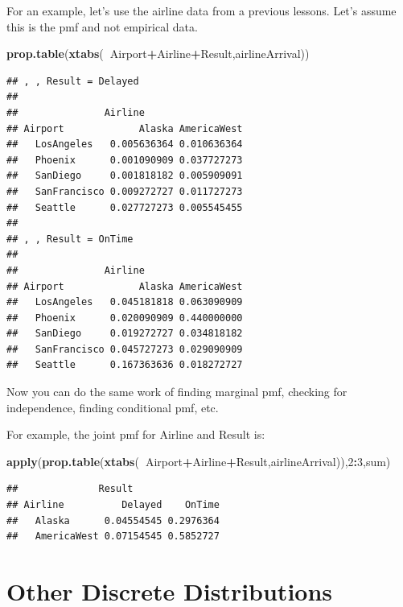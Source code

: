 \documentclass[]{book}
\newenvironment{Shaded}{\begin{snugshade}}{\end{snugshade}}
\newcommand{\KeywordTok}[1]{\textcolor[rgb]{0.13,0.29,0.53}{\textbf{#1}}}
\newcommand{\DecValTok}[1]{\textcolor[rgb]{0.00,0.00,0.81}{#1}}
\newcommand{\OperatorTok}[1]{\textcolor[rgb]{0.81,0.36,0.00}{\textbf{#1}}}
\newcommand{\NormalTok}[1]{#1}
\theoremstyle{definition}
\theoremstyle{definition}
\theoremstyle{definition}
\theoremstyle{remark}
\begin{document}
For an example, let's use the airline data from a previous lessons.
Let's assume this is the pmf and not empirical data.

\begin{Shaded}
\begin{Highlighting}[]
\KeywordTok{prop.table}\NormalTok{(}\KeywordTok{xtabs}\NormalTok{(}\OperatorTok{~}\NormalTok{Airport}\OperatorTok{+}\NormalTok{Airline}\OperatorTok{+}\NormalTok{Result,airlineArrival))}
\end{Highlighting}
\end{Shaded}

\begin{verbatim}
## , , Result = Delayed
## 
##               Airline
## Airport             Alaska AmericaWest
##   LosAngeles   0.005636364 0.010636364
##   Phoenix      0.001090909 0.037727273
##   SanDiego     0.001818182 0.005909091
##   SanFrancisco 0.009272727 0.011727273
##   Seattle      0.027727273 0.005545455
## 
## , , Result = OnTime
## 
##               Airline
## Airport             Alaska AmericaWest
##   LosAngeles   0.045181818 0.063090909
##   Phoenix      0.020090909 0.440000000
##   SanDiego     0.019272727 0.034818182
##   SanFrancisco 0.045727273 0.029090909
##   Seattle      0.167363636 0.018272727
\end{verbatim}

Now you can do the same work of finding marginal pmf, checking for
independence, finding conditional pmf, etc.

For example, the joint pmf for Airline and Result is:

\begin{Shaded}
\begin{Highlighting}[]
\KeywordTok{apply}\NormalTok{(}\KeywordTok{prop.table}\NormalTok{(}\KeywordTok{xtabs}\NormalTok{(}\OperatorTok{~}\NormalTok{Airport}\OperatorTok{+}\NormalTok{Airline}\OperatorTok{+}\NormalTok{Result,airlineArrival)),}\DecValTok{2}\OperatorTok{:}\DecValTok{3}\NormalTok{,sum)}
\end{Highlighting}
\end{Shaded}

\begin{verbatim}
##              Result
## Airline          Delayed    OnTime
##   Alaska      0.04554545 0.2976364
##   AmericaWest 0.07154545 0.5852727
\end{verbatim}

\hypertarget{L11}{\section{Other Discrete Distributions}\label{L11}}
\end{document}

